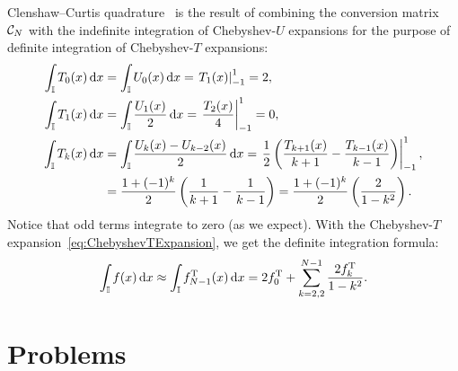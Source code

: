 Clenshaw--Curtis quadrature~\cite{Clenshaw-Curtis-2-197-60} is the result of combining the conversion matrix $\mathcal{C}_N$ with the indefinite integration of Chebyshev-$U$ expansions for the purpose of definite integration of Chebyshev-$T$ expansions:
\begin{align}
\int_{\mathbb{I}} T_0(x){\rm\,d} x & = \int_{\mathbb{I}} U_0(x){\rm\,d} x = \left.T_1(x)\right|_{-1}^1 = 2,\\
\int_{\mathbb{I}} T_1(x){\rm\,d} x & = \int_{\mathbb{I}} \dfrac{U_1(x)}{2}{\rm\,d} x = \left.\dfrac{T_2(x)}{4}\right|_{-1}^1 = 0,\\
\int_{\mathbb{I}} T_k(x){\rm\,d} x & = \int_{\mathbb{I}} \dfrac{U_k(x)-U_{k-2}(x)}{2}{\rm\,d} x = \left.\dfrac{1}{2}\left(\dfrac{T_{k+1}(x)}{k+1}-\dfrac{T_{k-1}(x)}{k-1}\right)\right|_{-1}^1,\\
& = \dfrac{1+(-1)^k}{2}\left(\dfrac{1}{k+1}-\dfrac{1}{k-1}\right) = \dfrac{1+(-1)^k}{2}\left(\dfrac{2}{1-k^2}\right).
\end{align}
Notice that odd terms integrate to zero (as we expect). With the Chebyshev-$T$ expansion~\eqref{eq:ChebyshevTExpansion}, we get the definite integration formula:
\begin{equation}
\int_{\mathbb{I}} f(x){\rm\,d} x \approx \int_{\mathbb{I}} f_{N-1}^{\rm T}(x){\rm\,d} x = 2f_0^{\rm T} + \sum_{k=2,2}^{N-1} \dfrac{2f_k^{\rm T}}{1-k^2}.
\end{equation}

\section{Problems}

